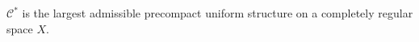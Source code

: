 $\mathcal{C}^*$ is the largest admissible precompact uniform structure on a completely regular space $X$.
